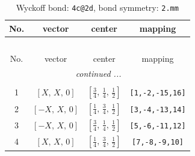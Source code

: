 \documentclass[fleqn,8pt]{jsarticle}
\begin{document}
\renewcommand{\arraystretch}{1.2}
\begin{longtable}{cccc}
\caption{Wyckoff bond: {\tt 4c@2d}, bond symmetry: {\tt 2.mm}}
 \\
 \hline \hline
No. & vector & center & mapping \\ \hline \endfirsthead

\multicolumn{3}{l}{\tablename\ \thetable{}} \\
 \hline \hline
No. & vector & center & mapping \\ \hline \endhead

 \hline \hline
\multicolumn{3}{r}{\footnotesize\it continued ...} \\ \endfoot

 \hline \hline
\multicolumn{3}{r}{} \\ \endlastfoot

1 & $\left[ X,\, X,\, 0 \right]$ & $\left[ \frac{3}{4},\, \frac{1}{4},\, \frac{1}{2} \right]$ & {\tt [1,-2,-15,16]} \\ \hline
2 & $\left[ - X,\, X,\, 0 \right]$ & $\left[ \frac{1}{4},\, \frac{3}{4},\, \frac{1}{2} \right]$ & {\tt [3,-4,-13,14]} \\ \hline
3 & $\left[ - X,\, X,\, 0 \right]$ & $\left[ \frac{3}{4},\, \frac{1}{4},\, \frac{1}{2} \right]$ & {\tt [5,-6,-11,12]} \\ \hline
4 & $\left[ X,\, X,\, 0 \right]$ & $\left[ \frac{1}{4},\, \frac{3}{4},\, \frac{1}{2} \right]$ & {\tt [7,-8,-9,10]} \\
\end{longtable}
\renewcommand{\arraystretch}{1.2}
\end{document}
